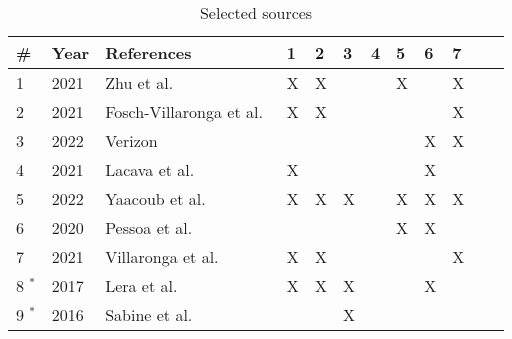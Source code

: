 \begin{table}[h]
  \centering
  \small
  \caption{Selected sources}
  \label{table:selected_sources}
  \begin{tabularx}{\textwidth}{|l|l|X|l|l|l|l|l|l|l|l|l|}
    \hline
    \textbf{\#}  & \textbf{Year} & \textbf{References}                                                         & \textbf{1} & \textbf{2} & \textbf{3} & \textbf{4} & \textbf{5}& \textbf{6}& \textbf{7}  \\\hline
    1            & 2021          & Zhu et al.~\cite[]{introduction_to_robot_system_security_2021}              & X          & X          &            &            & X          &            & X          \\\hline
    2            & 2021          & Fosch-Villaronga et al.~\cite[]{cyber_sec_safet_robots_legal_2021}          & X          & X          &            &            &  &  & X \\\hline
    3            & 2022          & Verizon~\cite[]{dbir_2022}                                                  &            &            &            &            &            & X          & X          \\\hline
    4            & 2021          & Lacava et al.~\cite[]{cyber_security_issues_in_robotics_2021}               & X          &            &            &            &            & X          &            \\\hline
    5            & 2022          & Yaacoub et al.~\cite[]{robotics_cyber_security_2022}                        & X          & X          & X          &            & X          & X          & X          \\\hline
    6            & 2020          & Pessoa et al.~\cite[]{smart_design_engineering_2020}                        &            &            &            &            & X          & X          &            \\\hline
    7            & 2021          & Villaronga et al.~\cite[]{cyber_sec_safety_robots_legal_2021}               & X          & X          &            &            &            &            & X          \\\hline
    8 $^{\ast}$  & 2017          & Lera et al.~\cite[]{cyber_sec_robotics_privacy_safety_2017}                 & X          & X & X &  &  & X &  \\\hline
    9 $^{\ast}$  & 2016          & Sabine et al.~\cite[]{if_robots_cause_harm_2016}                            &            &            & X          &            &            &            &            \\\hline

\end{tabularx}
\end{table}
